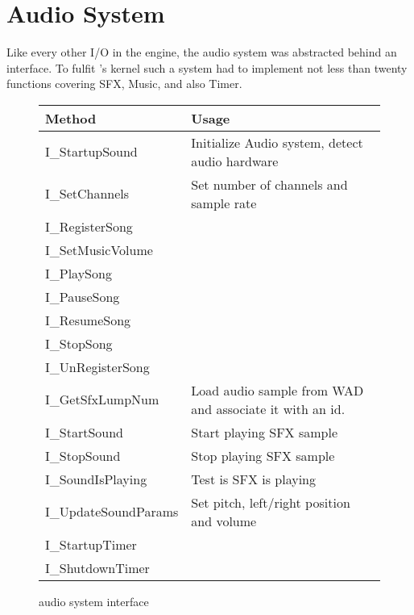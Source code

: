\section{Audio System}
\label{dmx_section}
Like every other I/O in the engine, the audio system was abstracted behind an interface. To fulfit \doom's kernel such a system had to implement not less than twenty functions covering SFX, Music, and also Timer.\\
\par
 \begin{figure}[H]
\centering  
\begin{tabularx}{\textwidth}{ L{0.6}  L{1.4}}
  \toprule
  \textbf{Method} &  \textbf{Usage}\\

  \toprule 
  I\_StartupSound & Initialize Audio system, detect audio hardware\\
  I\_SetChannels & Set number of channels and sample rate\\
  \toprule 
   
I\_RegisterSong & \\
I\_SetMusicVolume &\\
I\_PlaySong &\\
I\_PauseSong &\\
I\_ResumeSong &\\
I\_StopSong &\\
I\_UnRegisterSong & \\




  \toprule 
I\_GetSfxLumpNum & Load audio sample from WAD and associate it with an id.\\
I\_StartSound & Start playing SFX sample\\
I\_StopSound & Stop playing SFX sample\\
I\_SoundIsPlaying & Test is SFX is playing\\
I\_UpdateSoundParams & Set pitch, left/right position and volume\\

  \toprule 
  
I\_StartupTimer &\\
I\_ShutdownTimer &\\

  \toprule 



   \toprule
\end{tabularx}
\caption{\doom audio system interface}
\end{figure}



